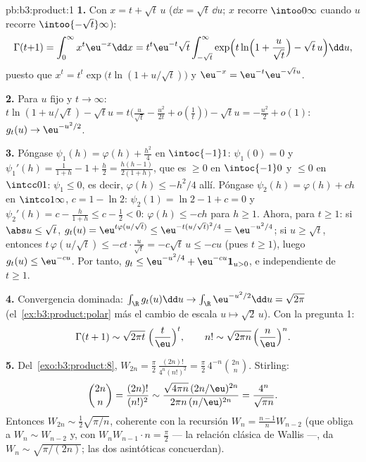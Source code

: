 \begin{solution}{pb:b3:product:1}
\textbf{1.} Con $x = t + \sqrt t\,u$ ($\dd x = \sqrt
t\,\dd u$; $x$ recorre $\intoo0\infty$ cuando $u$ recorre
$\intoo{-\sqrt t}\infty$):
\[
\Gamma(t{+}1) = \int_0^\infty x^t\eu^{-x}\dd x
= t^t\eu^{-t}\sqrt t\int_{-\sqrt t}^{\infty}
\exp\Bigl(t\ln\Bigl(1 + \frac u{\sqrt t}\Bigr) - \sqrt
t\,u\Bigr)\dd u,
\]
puesto que $x^t = t^t\exp\bigl(t\ln(1 + u/\sqrt t)\bigr)$ y
$\eu^{-x} = \eu^{-t}\eu^{-\sqrt tu}$.

\textbf{2.} Para $u$ fijo y $t \to \infty$: $t\ln(1 +
u/\sqrt t) - \sqrt tu = t\bigl(\frac u{\sqrt t} -
\frac{u^2}{2t} + o(\frac1t)\bigr) - \sqrt tu = -\frac{u^2}2 +
o(1)$: $g_t(u) \to \eu^{-u^2/2}$.

\textbf{3.} Póngase $\psi_1(h) = \varphi(h) + \frac{h^2}4$ en
$\intoc{-1}1$: $\psi_1(0) = 0$ y $\psi_1'(h) = \frac1{1+h} -
1 + \frac h2 = \frac{h(h-1)}{2(1+h)}$, que es $\geq 0$ en $\intoc{-1}0$
y $\leq 0$ en $\intcc01$: $\psi_1 \leq 0$, es decir,
$\varphi(h) \leq -h^2/4$ allí. Póngase $\psi_2(h) =
\varphi(h) + ch$ en $\intco1\infty$, $c = 1 - \ln2$: $\psi_2(1)
= \ln2 - 1 + c = 0$ y $\psi_2'(h) = c - \frac h{1+h} \leq c -
\frac12 < 0$: $\varphi(h) \leq -ch$ para $h \geq 1$. Ahora, para $t
\geq 1$: si $\abs u \leq \sqrt t$, $g_t(u) =
\eu^{t\varphi(u/\sqrt t)} \leq \eu^{-t(u/\sqrt t)^2/4} =
\eu^{-u^2/4}$; si $u \geq \sqrt t$, entonces $t\,\varphi(u/\sqrt t) \leq
-ct\cdot\frac u{\sqrt t} = -c\sqrt t\,u \leq -cu$ (pues $t \geq
1$), luego $g_t(u) \leq \eu^{-cu}$. Por tanto, $g_t \leq \eu^{-u^2/4} +
\eu^{-cu}\mathbf 1_{u>0}$,  e
independiente de $t \geq
1$.

\textbf{4.} Convergencia dominada: $\int_\R g_t(u)\dd u \to
\int_\R\eu^{-u^2/2}\dd u = \sqrt{2\pi}$ (el~\cref{ex:b3:product:polar}
más el cambio de escala $u\mapsto\sqrt2\,u$). Con la pregunta 1:
\[
\Gamma(t + 1) \sim \sqrt{2\pi t}\;\Bigl(\frac
t\eu\Bigr)^t,\qquad
n! \sim \sqrt{2\pi n}\,\Bigl(\frac n\eu\Bigr)^n .
\]

\textbf{5.} Del~\cref{exo:b3:product:8}, $W_{2n} =
\frac\pi2\,\frac{(2n)!}{4^n(n!)^2} =
\frac\pi2\,4^{-n}\binom{2n}n$. Stirling:
\[
\binom{2n}{n} = \frac{(2n)!}{(n!)^2}
\sim \frac{\sqrt{4\pi n}\,(2n/\eu)^{2n}}
{2\pi n\,(n/\eu)^{2n}} = \frac{4^n}{\sqrt{\pi n}} .
\]
Entonces $W_{2n} \sim \frac12\sqrt{\pi/n}$, coherente con la recursión
$W_n = \frac{n-1}nW_{n-2}$ (que obliga a $W_n \sim
W_{n-2}$ y, con $W_nW_{n-1}\cdot n = \frac\pi2$ --- la relación clásica
de Wallis ---, da $W_n \sim
\sqrt{\pi/(2n)}$; las dos asintóticas concuerdan).


\end{solution}
